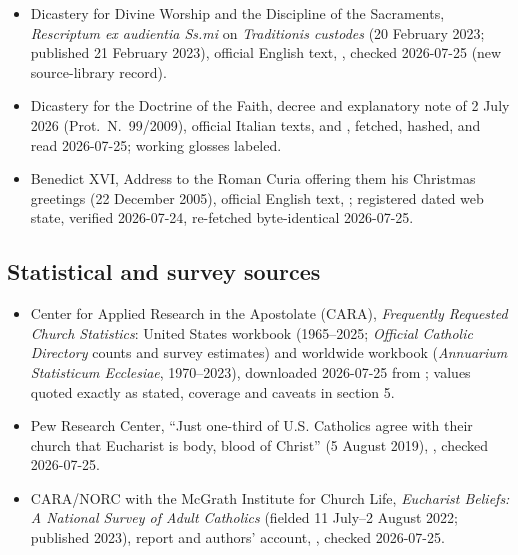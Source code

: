 {\begin{itemize}[itemsep=0pt,parsep=0pt,topsep=0.05em]
\item Dicastery for Divine Worship and the Discipline of the Sacraments, \emph{Rescriptum ex audientia Ss.mi} on \emph{Traditionis custodes} (20 February 2023; published 21 February 2023), official English text, , checked 2026-07-25 (new source-library record).
\item Dicastery for the Doctrine of the Faith, decree and explanatory note of 2 July 2026 (Prot.\ N.\ 99/2009), official Italian texts,  and , fetched, hashed, and read 2026-07-25; working glosses labeled.
\item Benedict XVI, Address to the Roman Curia offering them his Christmas greetings (22 December 2005), official English text, ; registered dated web state, verified 2026-07-24, re-fetched byte-identical 2026-07-25.
\end{itemize}}

\subsection*{Statistical and survey sources}

{\fontsize{8.6}{9.6}\selectfont
\begin{itemize}[itemsep=0pt,parsep=0pt,topsep=0.05em]
\item Center for Applied Research in the Apostolate (CARA), \emph{Frequently Requested Church Statistics}: United States workbook (1965--2025; \emph{Official Catholic Directory} counts and survey estimates) and worldwide workbook (\emph{Annuarium Statisticum Ecclesiae}, 1970--2023), downloaded 2026-07-25 from ; values quoted exactly as stated, coverage and caveats in section 5.
\item Pew Research Center, ``Just one-third of U.S. Catholics agree with their church that Eucharist is body, blood of Christ'' (5 August 2019), , checked 2026-07-25.
\item CARA/NORC with the McGrath Institute for Church Life, \emph{Eucharist Beliefs: A National Survey of Adult Catholics} (fielded 11 July--2 August 2022; published 2023), report and authors' account, , checked 2026-07-25.
\end{itemize}}

\endgroup
